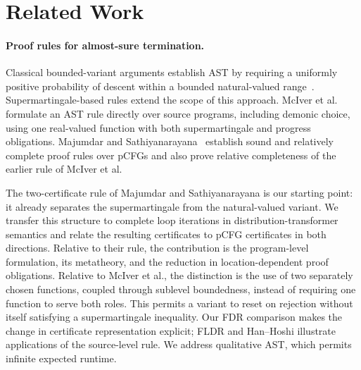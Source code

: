 \section{Related Work}
\label{sec:relwork}

\paragraph{Proof rules for almost-sure termination.}
Classical bounded-variant arguments establish AST by requiring a uniformly positive probability of descent within a bounded natural-valued range~\cite{DBLP:series/mcs/McIverM05}. Supermartingale-based rules extend the scope of this approach. McIver et al.~\cite{10.1145/3158121} formulate an AST rule directly over source programs, including demonic choice, using one real-valued function with both supermartingale and progress obligations. Majumdar and Sathiyanarayana~\cite{DBLP:journals/pacmpl/MajumdarS25} establish sound and relatively complete proof rules over pCFGs and also prove relative completeness of the earlier rule of McIver et al.

The two-certificate rule of Majumdar and Sathiyanarayana is our starting point: it already separates the supermartingale from the natural-valued variant. We transfer this structure to complete loop iterations in distribution-transformer semantics and relate the resulting certificates to pCFG certificates in both directions. Relative to their rule, the contribution is the program-level formulation, its metatheory, and the reduction in location-dependent proof obligations. Relative to McIver et al., the distinction is the use of two separately chosen functions, coupled through sublevel boundedness, instead of requiring one function to serve both roles. This permits a variant to reset on rejection without itself satisfying a supermartingale inequality. Our FDR comparison makes the change in certificate representation explicit; FLDR and Han--Hoshi illustrate applications of the source-level rule. We address qualitative AST, which permits infinite expected runtime.

